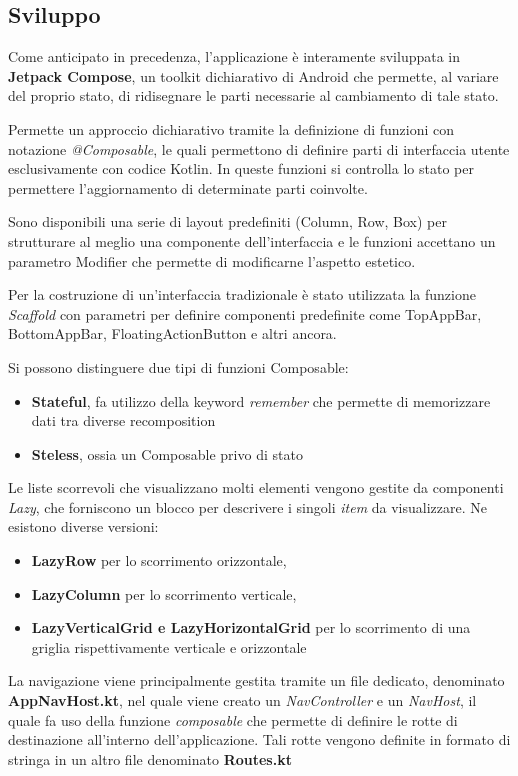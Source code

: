 \documentclass{article}
\begin{document}
\subsection{Sviluppo}
Come anticipato in precedenza, l'applicazione è interamente sviluppata in \textbf{Jetpack Compose}, un toolkit dichiarativo di Android che permette, al variare del proprio stato, di ridisegnare le parti necessarie al cambiamento di tale stato.

Permette un approccio dichiarativo tramite la definizione di funzioni con notazione \textit{@Composable}, le quali permettono di definire parti di interfaccia utente esclusivamente con codice Kotlin. 
In queste funzioni si controlla lo stato per permettere l'aggiornamento di determinate parti coinvolte.

Sono disponibili una serie di layout predefiniti (Column, Row, Box) per strutturare al meglio una componente dell'interfaccia e le funzioni accettano un parametro Modifier che permette di modificarne l'aspetto estetico.

Per la costruzione di un'interfaccia tradizionale è stato utilizzata la funzione \textit{Scaffold} con parametri per definire componenti predefinite come TopAppBar, BottomAppBar, FloatingActionButton e altri ancora.

Si possono distinguere due tipi di funzioni Composable:
\begin{itemize}
  \item \textbf{Stateful}, fa utilizzo della keyword \textit{remember} che permette di memorizzare dati tra diverse recomposition
  \item \textbf{Steless}, ossia un Composable privo di stato
\end{itemize}

Le liste scorrevoli che visualizzano molti elementi vengono gestite da componenti \textit{Lazy}, che forniscono un blocco per descrivere i singoli \textit{item} da visualizzare.  
Ne esistono diverse versioni:
\begin{itemize}
  \item \textbf{LazyRow} per lo scorrimento orizzontale,
  \item \textbf{LazyColumn} per lo scorrimento verticale,
  \item \textbf{LazyVerticalGrid e LazyHorizontalGrid} per lo scorrimento di una griglia rispettivamente verticale e orizzontale
\end{itemize}

La navigazione viene principalmente gestita tramite un file dedicato, denominato \textbf{AppNavHost.kt},
nel quale viene creato un \textit{NavController} e un \textit{NavHost},
il quale fa uso della funzione \textit{composable} che permette di definire le rotte di destinazione
all'interno dell'applicazione. Tali rotte vengono definite in formato di stringa in un altro file denominato \textbf{Routes.kt} 
\end{document}
